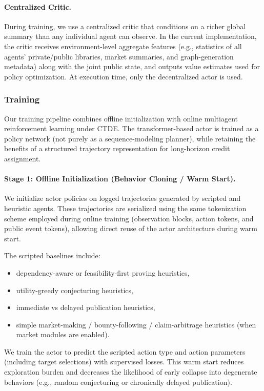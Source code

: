 \documentclass[letterpaper]{article} %
\begin{document}
\paragraph{Centralized Critic.}
During training, we use a centralized critic that conditions on a richer global summary than any individual agent can observe. In the current implementation, the critic receives environment-level aggregate features (e.g., statistics of all agents' private/public libraries, market summaries, and graph-generation metadata) along with the joint public state, and outputs value estimates used for policy optimization. At execution time, only the decentralized actor is used.
\subsubsection{Training}

Our training pipeline combines offline initialization with online multiagent reinforcement learning under CTDE. The transformer-based actor is trained as a policy network (not purely as a sequence-modeling planner), while retaining the benefits of a structured trajectory representation for long-horizon credit assignment.

\paragraph{Stage 1: Offline Initialization (Behavior Cloning / Warm Start).}
We initialize actor policies on logged trajectories generated by scripted and heuristic agents. These trajectories are serialized using the same tokenization scheme employed during online training (observation blocks, action tokens, and public event tokens), allowing direct reuse of the actor architecture during warm start.

The scripted baselines include:
\begin{itemize}
    \item dependency-aware or feasibility-first proving heuristics,
    \item utility-greedy conjecturing heuristics,
    \item immediate vs delayed publication heuristics,
    \item simple market-making / bounty-following / claim-arbitrage heuristics (when market modules are enabled).
\end{itemize}
We train the actor to predict the scripted action type and action parameters (including target selections) with supervised losses. This warm start reduces exploration burden and decreases the likelihood of early collapse into degenerate behaviors (e.g., random conjecturing or chronically delayed publication).
\end{document}

